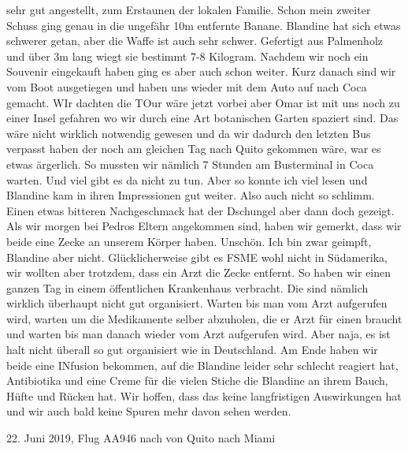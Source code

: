 \documentclass[11pt]{book}
\begin{document}
sehr gut angestellt, zum Erstaunen der lokalen Familie. Schon mein zweiter Schuss ging genau in die ungefähr 10m entfernte Banane. Blandine hat sich 
etwas schwerer getan, aber die Waffe ist auch sehr schwer. Gefertigt aus Palmenholz und über 3m lang wiegt sie bestimmt 7-8 Kilogram. Nachdem wir noch 
ein Souvenir eingekauft haben ging es aber auch schon weiter. Kurz danach sind wir vom Boot ausgetiegen und haben uns wieder mit dem Auto auf nach Coca 
gemacht. WIr dachten die TOur wäre jetzt vorbei aber Omar ist mit uns noch zu einer Insel gefahren wo wir durch eine Art botanischen Garten spaziert 
sind. Das wäre nicht wirklich notwendig gewesen und da wir dadurch den letzten Bus verpasst haben der noch am gleichen Tag nach Quito gekommen wäre, war es 
etwas ärgerlich. So mussten wir nämlich 7 Stunden am Busterminal in Coca warten. Und viel gibt es da nicht zu tun. Aber so konnte ich viel lesen und Blandine 
kam in ihren Impressionen gut weiter. Also auch nicht so schlimm. 
Einen etwas bitteren Nachgeschmack hat der Dschungel aber dann doch gezeigt. Als wir morgen bei Pedros Eltern angekommen sind, haben wir gemerkt, dass wir 
beide eine Zecke an unserem Körper haben. Unschön. Ich bin zwar geimpft, Blandine aber nicht. Glücklicherweise gibt es FSME wohl nicht in Südamerika, wir 
wollten aber trotzdem, dass ein Arzt die Zecke entfernt. So haben wir einen ganzen Tag in einem öffentlichen Krankenhaus verbracht. Die sind nämlich wirklich 
überhaupt nicht gut organisiert. Warten bis man vom Arzt aufgerufen wird, warten um die Medikamente selber abzuholen, die er Arzt für einen braucht und 
warten bis man danach wieder vom Arzt aufgerufen wird. Aber naja, es ist halt nicht überall so gut organisiert wie in Deutschland. Am Ende haben wir beide 
eine INfusion bekommen, auf die Blandine leider sehr schlecht reagiert hat, Antibiotika und eine Creme für die vielen Stiche die Blandine an ihrem Bauch, Hüfte 
und Rücken hat. Wir hoffen, dass das keine langfristigen Auswirkungen hat und wir auch bald keine Spuren mehr davon sehen werden.

22. Juni 2019, Flug AA946 nach von Quito nach Miami
\end{document}
